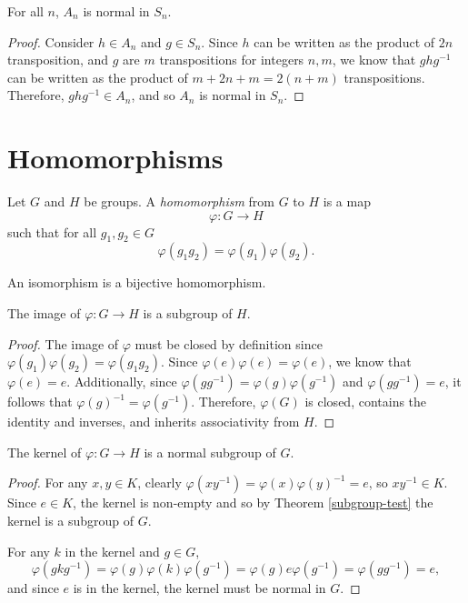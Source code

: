 \begin{prop}\label{alternating-normal-in-symmetric}
    For all $n$, $A_n$ is normal in $S_n$.
\end{prop}

\begin{proof}
    Consider $h \in A_n$ and $g \in S_n$. Since $h$ can be written as the product of $2n$ transposition, and $g$ are $m$ transpositions for integers $n, m$, we know that $ghg^{-1}$ can be written as the product of $m + 2n + m = 2(n + m)$ transpositions. Therefore, $ghg^{-1} \in A_n$, and so $A_n$ is normal in $S_n$.
\end{proof}

\section{Homomorphisms}

\begin{defn}
    Let $G$ and $H$ be groups. A \emph{homomorphism} from $G$ to $H$ is a map
    \[\varphi: G \to H\] such that for all $g_1, g_2 \in G$
    \[\varphi(g_1g_2) = \varphi(g_1)\varphi(g_2).\]
\end{defn}

\begin{rmk}
    An isomorphism is a bijective homomorphism.
\end{rmk}

\begin{prop}
    The image of $\varphi: G \to H$ is a subgroup of $H$.
\end{prop}

\begin{proof}
    The image of $\varphi$ must be closed by definition since $\varphi(g_1)\varphi(g_2) = \varphi(g_1g_2)$. Since $\varphi(e)\varphi(e) = \varphi(e)$, we know that $\varphi(e) = e$. Additionally, since $\varphi(gg^{-1}) = \varphi(g)\varphi(g^{-1})$ and $\varphi(gg^{-1}) = e$, it follows that $\varphi(g)^{-1} = \varphi(g^{-1})$. Therefore, $\varphi(G)$ is closed, contains the identity and inverses, and inherits associativity from $H$.
\end{proof}

\begin{prop}\label{kernel-normal-subgroup}
    The kernel of $\varphi: G \to H$ is a normal subgroup of $G$.
\end{prop}

\begin{proof}
    For any $x, y \in K$, clearly $\varphi(xy^{-1}) = \varphi(x)\varphi(y)^{-1} = e$, so $xy^{-1} \in K$. Since $e \in K$, the kernel is non-empty and so by Theorem \ref{subgroup-test} the kernel is a subgroup of $G$.

    For any $k$ in the kernel and $g \in G$,
    \[\varphi(gkg^{-1}) = \varphi(g)\varphi(k)\varphi(g^{-1}) = \varphi(g)e\varphi(g^{-1}) = \varphi(gg^{-1}) = e,\]
    and since $e$ is in the kernel, the kernel must be normal in $G$.
\end{proof}

